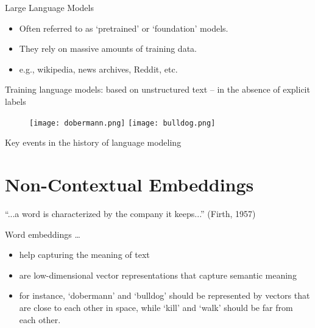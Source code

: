 \documentclass[compress]{beamer}
\begin{document}
\begin{frame}{Large Language Models}
	\begin{itemize}
		\item Often referred to as `pretrained' or `foundation' models.
		\item They rely on massive amounts of training data. 
		\item e.g., wikipedia, news archives, Reddit, etc. 
	\end{itemize}
\end{frame}

\begin{frame} {Training language models: based on unstructured text -- in the absence of explicit labels}
	\begin{figure}
		\texttt{[image: dobermann.png]}
		\hfill
		\texttt{[image: bulldog.png]}
	\end{figure}
\end{frame}

\begin{frame}{Key events in the history of language modeling}
\end{frame}


\section{Non-Contextual Embeddings}

\begin{frame}{``...a word is characterized by the company it keeps...'' (Firth, 1957)}
	\begin{block}{Word embeddings \ldots}
		\begin{itemize}
			\item help capturing the meaning of text
			\item are low-dimensional vector representations that capture semantic meaning
			\item for instance, `dobermann' and `bulldog' should be represented by vectors that are close to each other in space, while `kill' and `walk' should be far from each other.
		\end{itemize}
	\end{block}
\end{frame}
\end{document}
